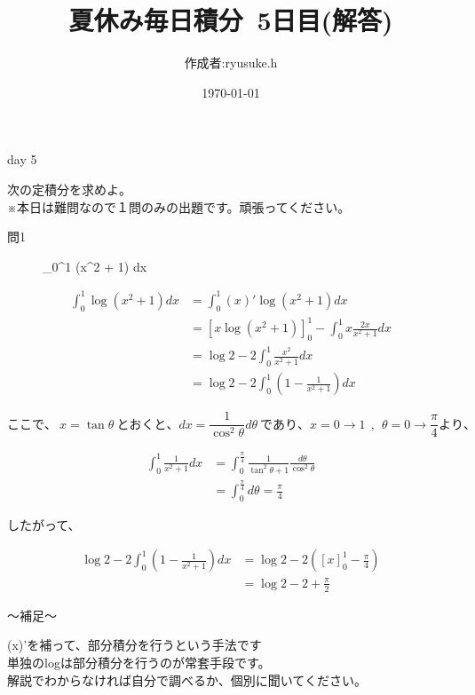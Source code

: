 \documentclass[12pt,a4paper]{jsarticle}
\title{夏休み毎日積分~5日目(解答)}
\date{\today}
\begin{document}
\maketitle

\begin{flushright}
    \author{作成者:ryusuke.h}
\end{flushright}

\begin{itembox}[c]{day 5 }
    \begin{center}
        次の定積分を求めよ。\\
        ※本日は難問なので１問のみの出題です。頑張ってください。
    \end{center}
\end{itembox}

\begin{description}
    \item [問1] {\displaystyle}\int_0^1 \log(x^2 + 1) dx 
\end{description}

\begin{align*}
    \int_0^1 \log(x^2 + 1) dx &= \int_0^1 (x)'\log(x^2 + 1) dx \\
        &= [x\log(x^2 + 1)]_0^1 - \int_0^1 x\frac{2x}{x^2 + 1} dx \\
        &= \log2 - 2\int_0^1\frac{x^2}{x^2 + 1} dx \\
        &= \log2 - 2\int_0^1 (1 - \frac{1}{x^2+1} ) dx
\end{align*}

\begin{equation*}
    ここで、 ~x = \tan{\theta}~とおくと、 dx = \frac{1}{\cos^2\theta}d{\theta}~であり、x = 0 → 1 ~~,~~\theta = 0 → \frac{\pi}{4}より、
\end{equation*}

\begin{align*}
    \int_0^1 \frac{1}{x^2 + 1} dx &= \int_0^\frac{\pi}{4} \frac{1}{\tan^2\theta + 1}\frac{d\theta}{\cos^2\theta} \\
    &= \int_0^\frac{\pi}{4} d\theta = \frac{\pi}{4}
\end{align*}

したがって、

\begin{align*}
    \log2 - 2\int_0^1 (1 - \frac{1}{x^2 + 1}) dx &= \log2 - 2([x]_0^1 - \frac{\pi}{4}) \\
    &= \log2 - 2 + \frac{\pi}{2}
\end{align*}

\begin{boxnote}
    〜補足〜
    \begin{center}
        (x)'を補って、部分積分を行うという手法です\\
        単独のlogは部分積分を行うのが常套手段です。 \\
        解説でわからなければ自分で調べるか、個別に聞いてください。
    \end{center}
\end{boxnote}
\end{document}
